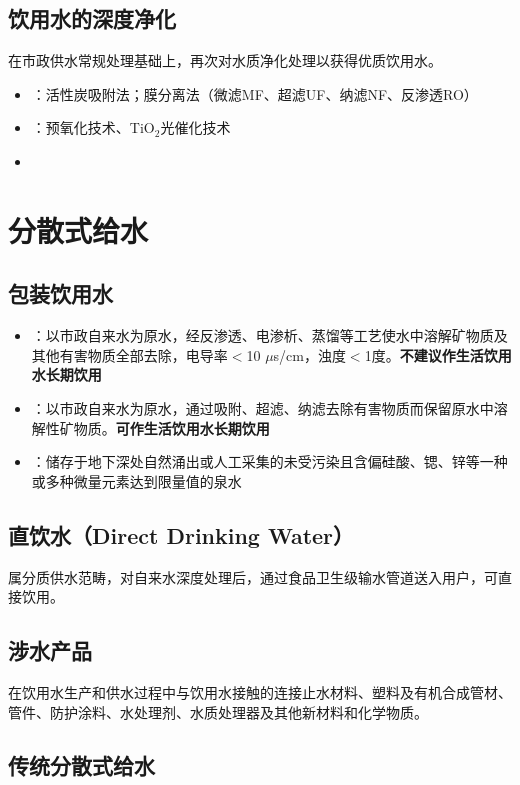 \documentclass[10pt,a4paper,oneside]{ctexbook}
\begin{document}
\subsection{饮用水的深度净化}

在市政供水常规处理基础上，再次对水质净化处理以获得优质饮用水。
\begin{itemize}[leftmargin=*]
    \item {}：活性炭吸附法；膜分离法（微滤MF、超滤UF、纳滤NF、反渗透RO）
    \item {}：预氧化技术、TiO$_2$光催化技术
    \item {}
\end{itemize}

\section{分散式给水}

\subsection{包装饮用水}
\begin{itemize}[leftmargin=*]
    \item {}：以市政自来水为原水，经反渗透、电渗析、蒸馏等工艺使水中溶解矿物质及其他有害物质全部去除，电导率$<$10 $\mu$s/cm，浊度$<$1度。\textbf{不建议作生活饮用水长期饮用}
    \item {}：以市政自来水为原水，通过吸附、超滤、纳滤去除有害物质而保留原水中溶解性矿物质。\textbf{可作生活饮用水长期饮用}
    \item {}：储存于地下深处自然涌出或人工采集的未受污染且含偏硅酸、锶、锌等一种或多种微量元素达到限量值的泉水
\end{itemize}

\subsection{直饮水（Direct Drinking Water）}
属分质供水范畴，对自来水深度处理后，通过食品卫生级输水管道送入用户，可直接饮用。

\subsection{涉水产品}
在饮用水生产和供水过程中与饮用水接触的连接止水材料、塑料及有机合成管材、管件、防护涂料、水处理剂、水质处理器及其他新材料和化学物质。

\subsection{传统分散式给水}
\end{document}
